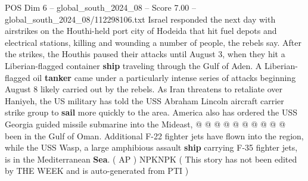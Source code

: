 \begin{textsample}{POS Dim 6 – global\_south\_2024\_08 – Score 7.00 – global\_south\_2024\_08/112298106.txt}
Israel responded the next day with airstrikes on the Houthi-held port city of Hodeida that hit fuel depots and electrical stations, killing and wounding a number of people, the rebels say.
After the strikes, the Houthis paused their attacks until August 3, when they hit a Liberian-flagged container \textbf{ship} traveling through the Gulf of Aden.
A Liberian-flagged oil \textbf{tanker} came under a particularly intense series of attacks beginning August 8 likely carried out by the rebels.
As Iran threatens to retaliate over Haniyeh, the US military has told the USS Abraham Lincoln aircraft carrier strike group to \textbf{sail} more quickly to the area.
America also has ordered the USS Georgia guided missile submarine into the Mideast, @ @ @ @ @ @ @ @ @ @ been in the Gulf of Oman.
Additional F-22 fighter jets have flown into the region, while the USS Wasp, a large amphibious assault \textbf{ship} carrying F-35 fighter jets, is in the Mediterranean \textbf{Sea}. ( AP ) NPKNPK ( This story has not been edited by THE WEEK and is auto-generated from PTI )

\end{textsample}
